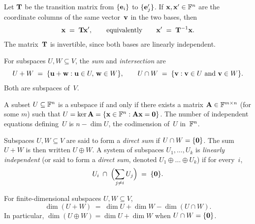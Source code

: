 \begin{theorem}
\label{thm:change-of-basis}
Let $\mathbf{T}$ be the transition matrix from $\{\mathbf{e}_i\}$ to
$\{\mathbf{e}'_j\}$. If $\mathbf{x}, \mathbf{x}' \in \mathbb{F}^n$ are the
coordinate columns of the same vector~$\mathbf{v}$ in the two bases,
then
\[
  \mathbf{x} \;=\; \mathbf{T} \mathbf{x}', \qquad \text{equivalently} \qquad
  \mathbf{x}' \;=\; \mathbf{T}^{-1} \mathbf{x}.
\]
The matrix~$\mathbf{T}$ is invertible, since both bases are linearly
independent.
\end{theorem}

\begin{definition}
\label{def:sum-intersection}
For subspaces $U, W \subseteq V$, the \emph{sum} and \emph{intersection}
are
\[
  U + W \;=\; \{\mathbf{u} + \mathbf{w} : \mathbf{u} \in U,\, \mathbf{w} \in W\},
  \qquad
  U \cap W \;=\; \{\mathbf{v} : \mathbf{v} \in U \text{ and } \mathbf{v} \in W\}.
\]
Both are subspaces of~$V$.
\end{definition}

\begin{theorem}
\label{thm:subspace-kernel}
A subset $U \subseteq \mathbb{F}^n$ is a subspace if and only if there exists a
matrix $\mathbf{A} \in \mathbb{F}^{m \times n}$ (for some $m$) such that
$U = \ker \mathbf{A} = \{\mathbf{x} \in \mathbb{F}^n : \mathbf{A}\mathbf{x} = \mathbf{0}\}$.
The number of independent equations defining~$U$ is
$n - \dim U$, the codimension of~$U$ in~$\mathbb{F}^n$.
\end{theorem}

\begin{definition}
\label{def:direct-sum}
Subspaces $U, W \subseteq V$ are said to form a \emph{direct sum} if
$U \cap W = \{\mathbf{0}\}$. The sum $U + W$ is then written $U \oplus W$.
A system of subspaces $U_1, \dots, U_k$ is \emph{linearly independent}
(or said to form a \emph{direct sum}, denoted $U_1 \oplus \dots \oplus U_k$)
if for every~$i$,
\[
  U_i \;\cap\; \Bigl(\sum_{j \neq i} U_j\Bigr) \;=\; \{\mathbf{0}\}.
\]
\end{definition}

\begin{theorem}
\label{thm:grassmann}
For finite-dimensional subspaces $U, W \subseteq V$,
\[
  \dim(U + W) \;=\; \dim U + \dim W - \dim(U \cap W).
\]
In particular, $\dim(U \oplus W) = \dim U + \dim W$ when $U \cap W = \{\mathbf{0}\}$.
\end{theorem}

